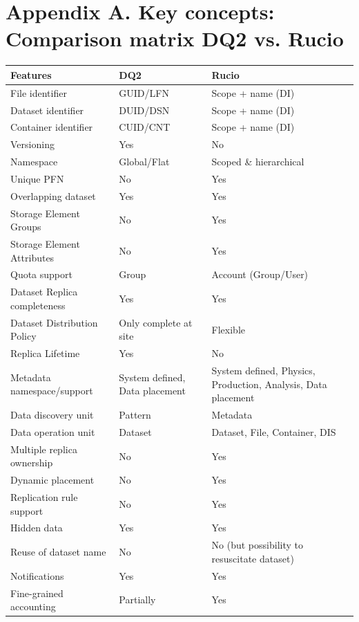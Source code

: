 \documentclass{atlasnote}
\begin{document}
\section*{Appendix A. Key concepts: Comparison matrix DQ2 vs. Rucio}
\label{Comparison_matrix:key-concepts-comparison-matrix-dq2-vs-rucio}
\begin{tabular}{l l p{5cm} }
\toprule
\textbf{
Features
} & \textbf{
DQ2
} & \textbf{
Rucio
}\\
\midrule
File identifier & GUID/LFN & Scope + name (DI) \\
Dataset identifier & DUID/DSN & Scope + name (DI) \\
Container identifier & CUID/CNT & Scope + name (DI) \\
Versioning & Yes & No \\
Namespace & Global/Flat & Scoped \& hierarchical \\
Unique PFN & No & Yes \\
Overlapping dataset & Yes & Yes \\
Storage Element Groups & No & Yes \\
Storage Element Attributes & No & Yes \\
Quota support & Group & Account (Group/User) \\
Dataset Replica completeness & Yes & Yes \\
Dataset Distribution Policy & Only complete at site & Flexible \\
Replica Lifetime & Yes & No \\
Metadata namespace/support & System defined, Data placement & System defined, Physics, Production, Analysis, Data placement \\
Data discovery unit & Pattern & Metadata\\
Data operation unit &Dataset & Dataset, File, Container, DIS \\
Multiple replica ownership & No & Yes \\
Dynamic placement & No & Yes \\
Replication rule support & No & Yes \\
Hidden data & Yes & Yes \\
Reuse of dataset name & No & No (but possibility to resuscitate dataset) \\
Notifications & Yes & Yes \\
Fine-grained accounting & Partially & Yes \\
\bottomrule
\end{tabular}

\newpage
\end{document}
